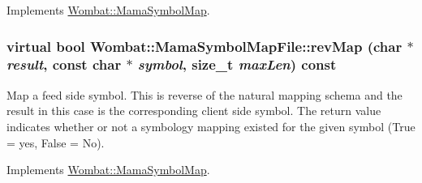 Implements \hyperlink{classWombat_1_1MamaSymbolMap_a2e4d030ecbca9255a90c7f1d157800ef}{Wombat::MamaSymbolMap}.\hypertarget{classWombat_1_1MamaSymbolMapFile_a5547093417653f35d964c39f7e806374}{
\subsubsection[{revMap}]{\setlength{\rightskip}{0pt plus 5cm}virtual bool Wombat::MamaSymbolMapFile::revMap (char $\ast$ {\em result}, \/  const char $\ast$ {\em symbol}, \/  size\_\-t {\em maxLen}) const}}
\label{classWombat_1_1MamaSymbolMapFile_a5547093417653f35d964c39f7e806374}


Map a feed side symbol. This is reverse of the natural mapping schema and the result in this case is the corresponding client side symbol. The return value indicates whether or not a symbology mapping existed for the given symbol (True = yes, False = No). 

Implements \hyperlink{classWombat_1_1MamaSymbolMap_ae6807122277f6e8fe9ac5a2a07725ccf}{Wombat::MamaSymbolMap}.